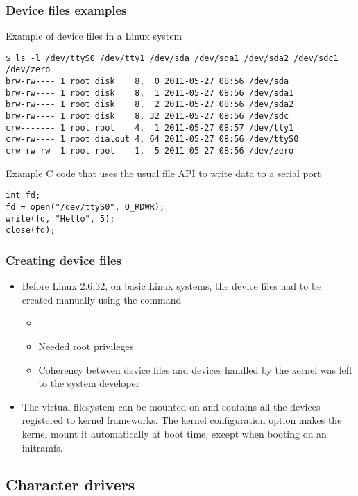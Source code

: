 \begin{frame}[fragile]
\frametitle{Device files examples}

Example of device files in a Linux system

\small
\begin{verbatim}
$ ls -l /dev/ttyS0 /dev/tty1 /dev/sda /dev/sda1 /dev/sda2 /dev/sdc1 /dev/zero
brw-rw---- 1 root disk    8,  0 2011-05-27 08:56 /dev/sda
brw-rw---- 1 root disk    8,  1 2011-05-27 08:56 /dev/sda1
brw-rw---- 1 root disk    8,  2 2011-05-27 08:56 /dev/sda2
brw-rw---- 1 root disk    8, 32 2011-05-27 08:56 /dev/sdc
crw------- 1 root root    4,  1 2011-05-27 08:57 /dev/tty1
crw-rw---- 1 root dialout 4, 64 2011-05-27 08:56 /dev/ttyS0
crw-rw-rw- 1 root root    1,  5 2011-05-27 08:56 /dev/zero
\end{verbatim}
\normalsize

Example C code that uses the usual file API to write data to a serial port

\small
\begin{verbatim}
int fd;
fd = open("/dev/ttyS0", O_RDWR);
write(fd, "Hello", 5);
close(fd);
\end{verbatim}
\end{frame}

\begin{frame}
  \frametitle{Creating device files}
  \begin{itemize}
    \item Before Linux 2.6.32, on basic Linux systems,
    the device files had to be created manually using the
     command
    \begin{itemize}
    \item {}
    \item Needed root privileges
    \item Coherency between device files and devices handled by the
      kernel was left to the system developer
    \end{itemize}
  \item The  virtual filesystem can be mounted on
     and contains all the devices registered to kernel frameworks.
    The  kernel configuration option
    makes the kernel mount it automatically at boot time, except
    when booting on an initramfs.
  \end{itemize}
\end{frame}

\subsection{Character drivers}

